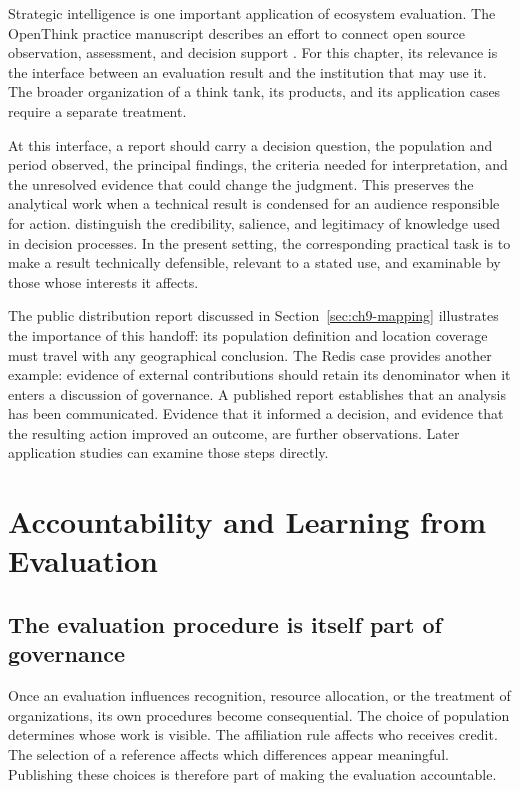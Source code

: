 Strategic intelligence is one important application of ecosystem evaluation. The OpenThink practice manuscript describes an effort to connect open source observation, assessment, and decision support \citep{openthink}. For this chapter, its relevance is the interface between an evaluation result and the institution that may use it. The broader organization of a think tank, its products, and its application cases require a separate treatment.

At this interface, a report should carry a decision question, the population and period observed, the principal findings, the criteria needed for interpretation, and the unresolved evidence that could change the judgment. This preserves the analytical work when a technical result is condensed for an audience responsible for action. \citet{cash2003} distinguish the credibility, salience, and legitimacy of knowledge used in decision processes. In the present setting, the corresponding practical task is to make a result technically defensible, relevant to a stated use, and examinable by those whose interests it affects.

The public distribution report discussed in Section~\ref{sec:ch9-mapping} illustrates the importance of this handoff: its population definition and location coverage must travel with any geographical conclusion. The Redis case provides another example: evidence of external contributions should retain its denominator when it enters a discussion of governance. A published report establishes that an analysis has been communicated. Evidence that it informed a decision, and evidence that the resulting action improved an outcome, are further observations. Later application studies can examine those steps directly.

\section{Accountability and Learning from Evaluation}
\label{sec:ch9-accountability}

\subsection{The evaluation procedure is itself part of governance}
Once an evaluation influences recognition, resource allocation, or the treatment of organizations, its own procedures become consequential. The choice of population determines whose work is visible. The affiliation rule affects who receives credit. The selection of a reference affects which differences appear meaningful. Publishing these choices is therefore part of making the evaluation accountable.


